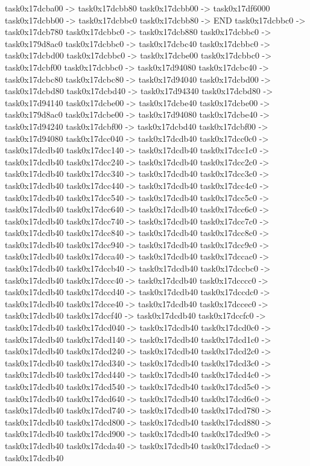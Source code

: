 {	task0x17dcba00 -> task0x17dcbb80
	task0x17dcbb00 -> task0x17df6000
	task0x17dcbb00 -> task0x17dcbbc0
	task0x17dcbb80 -> END
	task0x17dcbbc0 -> task0x17dcb780
	task0x17dcbbc0 -> task0x17dcb880
	task0x17dcbbc0 -> task0x179d8ac0
	task0x17dcbbc0 -> task0x17dcbc40
	task0x17dcbbc0 -> task0x17dcbd00
	task0x17dcbbc0 -> task0x17dcbe00
	task0x17dcbbc0 -> task0x17dcbf00
	task0x17dcbbc0 -> task0x17d94080
	task0x17dcbc40 -> task0x17dcbc80
	task0x17dcbc80 -> task0x17d94040
	task0x17dcbd00 -> task0x17dcbd80
	task0x17dcbd40 -> task0x17d94340
	task0x17dcbd80 -> task0x17d94140
	task0x17dcbe00 -> task0x17dcbe40
	task0x17dcbe00 -> task0x179d8ac0
	task0x17dcbe00 -> task0x17d94080
	task0x17dcbe40 -> task0x17d94240
	task0x17dcbf00 -> task0x17dcbd40
	task0x17dcbf00 -> task0x17d94080
	task0x17dcc040 -> task0x17dcdb40
	task0x17dcc0c0 -> task0x17dcdb40
	task0x17dcc140 -> task0x17dcdb40
	task0x17dcc1c0 -> task0x17dcdb40
	task0x17dcc240 -> task0x17dcdb40
	task0x17dcc2c0 -> task0x17dcdb40
	task0x17dcc340 -> task0x17dcdb40
	task0x17dcc3c0 -> task0x17dcdb40
	task0x17dcc440 -> task0x17dcdb40
	task0x17dcc4c0 -> task0x17dcdb40
	task0x17dcc540 -> task0x17dcdb40
	task0x17dcc5c0 -> task0x17dcdb40
	task0x17dcc640 -> task0x17dcdb40
	task0x17dcc6c0 -> task0x17dcdb40
	task0x17dcc740 -> task0x17dcdb40
	task0x17dcc7c0 -> task0x17dcdb40
	task0x17dcc840 -> task0x17dcdb40
	task0x17dcc8c0 -> task0x17dcdb40
	task0x17dcc940 -> task0x17dcdb40
	task0x17dcc9c0 -> task0x17dcdb40
	task0x17dcca40 -> task0x17dcdb40
	task0x17dccac0 -> task0x17dcdb40
	task0x17dccb40 -> task0x17dcdb40
	task0x17dccbc0 -> task0x17dcdb40
	task0x17dccc40 -> task0x17dcdb40
	task0x17dcccc0 -> task0x17dcdb40
	task0x17dccd40 -> task0x17dcdb40
	task0x17dccdc0 -> task0x17dcdb40
	task0x17dcce40 -> task0x17dcdb40
	task0x17dccec0 -> task0x17dcdb40
	task0x17dccf40 -> task0x17dcdb40
	task0x17dccfc0 -> task0x17dcdb40
	task0x17dcd040 -> task0x17dcdb40
	task0x17dcd0c0 -> task0x17dcdb40
	task0x17dcd140 -> task0x17dcdb40
	task0x17dcd1c0 -> task0x17dcdb40
	task0x17dcd240 -> task0x17dcdb40
	task0x17dcd2c0 -> task0x17dcdb40
	task0x17dcd340 -> task0x17dcdb40
	task0x17dcd3c0 -> task0x17dcdb40
	task0x17dcd440 -> task0x17dcdb40
	task0x17dcd4c0 -> task0x17dcdb40
	task0x17dcd540 -> task0x17dcdb40
	task0x17dcd5c0 -> task0x17dcdb40
	task0x17dcd640 -> task0x17dcdb40
	task0x17dcd6c0 -> task0x17dcdb40
	task0x17dcd740 -> task0x17dcdb40
	task0x17dcd780 -> task0x17dcdb40
	task0x17dcd800 -> task0x17dcdb40
	task0x17dcd880 -> task0x17dcdb40
	task0x17dcd900 -> task0x17dcdb40
	task0x17dcd9c0 -> task0x17dcdb40
	task0x17dcda40 -> task0x17dcdb40
	task0x17dcdac0 -> task0x17dcdb40
}
